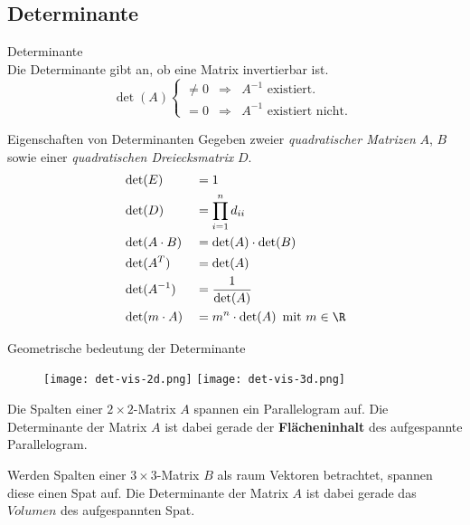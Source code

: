 \subsection{Determinante}
    \begin{definition}{Determinante}\\
        Die Determinante gibt an, ob eine Matrix invertierbar ist.
        \begin{equation*}
            \det(A)
            \left\{
                \begin{array}{lll}
                    \neq 0   &\Rightarrow    & A^{-1} \text{ existiert. }\\
                    = 0     &\Rightarrow    & A^{-1} \text{ existiert nicht. }
                \end{array}
            \right.
        \end{equation*}
    \end{definition}

    \begin{theorem}{Eigenschaften von Determinanten}
        Gegeben zweier \textit{quadratischer Matrizen} $A$, $B$ 
        sowie einer \textit{quadratischen Dreiecksmatrix} $D$.
        \begin{align*}
            &\det(E)        &&=1                     \\
            &\det(D)        &&=\prod_{i=1}^n d_{ii}  \\
            &\det(A\cdot B) &&=\det(A)\cdot\det(B)   \\
            &\det(A^T)      &&=\det(A)               \\
            &\det(A^{-1})   &&=\frac{1}{\det(A)}     \\
            &\det(m\cdot A) &&=m^n\cdot\det(A)\, \text{ mit } m\in \R
        \end{align*}
    \end{theorem}

    \begin{theorem}{Geometrische bedeutung der Determinante}


        \begin{wrapfigure}[16]{hr!}{0.35\textwidth}
            \vspace{-10pt}
            \texttt{[image: det-vis-2d.png]}
            \texttt{[image: det-vis-3d.png]}
        \end{wrapfigure}
        Die Spalten einer $2\times 2$-Matrix $A$ spannen ein Parallelogram auf.
        Die Determinante der Matrix $A$ ist dabei gerade der \textbf{Flächeninhalt} des aufgespannte Parallelogram.
        \vspace{1.25em}

        Werden Spalten einer $3\times 3$-Matrix $B$ als raum Vektoren betrachtet, 
        spannen diese einen Spat auf.
        Die Determinante der Matrix $A$ ist dabei gerade das $Volumen$ des aufgespannten Spat.
        \vspace{1em}
    \end{theorem}

